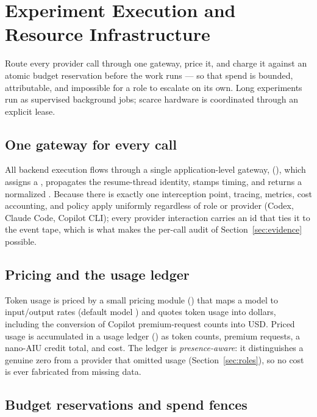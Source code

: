 \section{Experiment Execution and Resource Infrastructure}
\label{sec:execution}

\begin{designbox}
Route every provider call through one gateway, price it, and charge it against an
atomic budget reservation before the work runs --- so that spend is bounded,
attributable, and impossible for a role to escalate on its own. Long experiments
run as supervised background jobs; scarce hardware is coordinated through an
explicit lease.
\end{designbox}

\subsection{One gateway for every call}

All backend execution flows through a single application-level gateway,
 (), which assigns a
, propagates the resume-thread identity, stamps timing, and returns
a normalized . Because there is exactly one interception point,
tracing, metrics, cost accounting, and policy apply uniformly regardless of role or
provider (Codex, Claude Code, Copilot CLI); every provider interaction carries an
id that ties it to the event tape, which is what makes the per-call audit of
Section~\ref{sec:evidence} possible.

\subsection{Pricing and the usage ledger}

Token usage is priced by a small pricing module ()
that maps a model to input/output rates (default model ) and quotes
token usage into dollars, including the conversion of Copilot premium-request
counts into USD. Priced usage is accumulated in a usage ledger
() as token counts, premium requests, a nano-AIU credit
total, and cost. The ledger is \emph{presence-aware}: it distinguishes a genuine
zero from a provider that omitted usage (Section~\ref{sec:roles}), so no cost is
ever fabricated from missing data.

\subsection{Budget reservations and spend fences}

